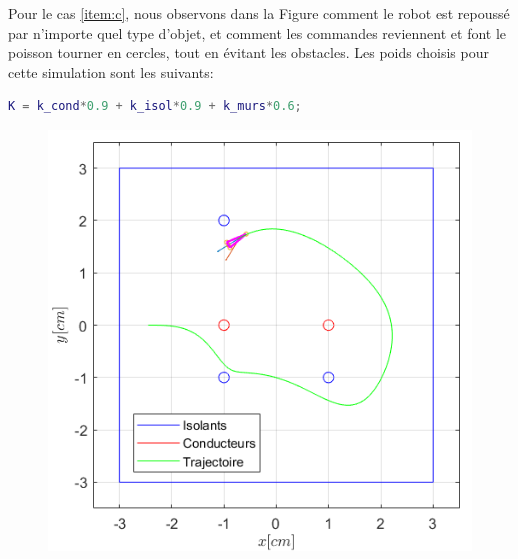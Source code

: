 Pour le cas \ref{item:c}, nous observons dans la Figure comment le robot est repoussé par n'importe quel type d'objet, et comment les commandes reviennent et font le poisson tourner en cercles, tout en évitant les obstacles. Les poids choisis pour cette simulation sont les suivants: 
\begin{lstlisting}[language=matlab, caption={Extrait du fichier \mcode{f_currents.m}}, firstnumber = 77, aboveskip=-0.3 \baselineskip, belowskip=-0.6 \baselineskip]
K = k_cond*0.9 + k_isol*0.9 + k_murs*0.6;
\end{lstlisting}

\begin{figure}[h!]
\centering
\begin{minipage}{0.45\textwidth}
  \centering
  \includegraphics[width=\linewidth]{assets/essais/6_objets/6_objets.png}
\end{minipage}%
\begin{minipage}{0.45\textwidth}
  \centering

\end{minipage}
\end{figure}
